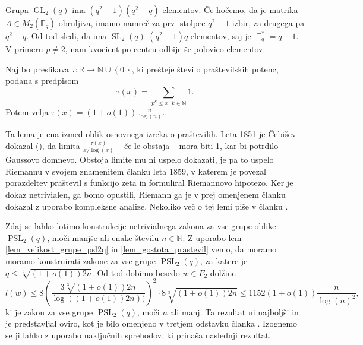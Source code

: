     \begin{dokaz}
    Grupa $\operatorname{GL}_2(q)$ ima $(q^2  -1)(q^2 - q)$ elementov. Če hočemo, da je matrika $A \in M_2(\mathbb{F}_q)$ obrnljiva, imamo namreč za prvi stolpec $q^2 -1$ izbir, za drugega pa $q^2 - q$.
    Od tod sledi, da ima $\operatorname{SL}_2(q)$ $(q^2  -1)q$ elementov, saj je $\lvert \mathbb{F}_q^{*} \rvert = q-1$. V primeru $p \neq 2$, nam kvocient po centru odbije še polovico elementov.   
    \end{dokaz}
    
    \begin{lema}
    \label{lem_gostota_prastevil}
    Naj bo preslikava $\tau : \mathbb{R} \to \mathbb{N} \cup \left\{ 0\right\}$, ki prešteje število praštevilskih potenc, podana s predpisom \begin{equation*}
    \tau(x) = \sum_{p^{k} \le x, \, k \in \mathbb{N}} 1.
    \end{equation*}  
     Potem velja $\tau(x) = (1 + o(1)) \frac{n}{\log(n)}$.     
    \end{lema}
    Ta lema je ena izmed oblik osnovnega izreka o praštevilih. Leta     1851 je Čebišev dokazal (\cite[str.~4--5]{Granville_1993}), da limita $\frac{\tau(x)}{x / \log(x)}$ -- če le obstaja -- mora biti 1, kar bi potrdilo Gaussovo domnevo. Obstoja limite mu ni uspelo dokazati, je pa to uspelo Riemannu v svojem znamenitem članku \cite{Riemann_1859} leta 1859, v katerem je povezal porazdeltev praštevil s funkcijo zeta in formuliral Riemannovo hipotezo.
    Ker je dokaz netrivialen, ga bomo opustili, Riemann ga je v prej omenjenem članku dokazal z uporabo kompleksne analize. 
    Nekoliko več o tej lemi piše v članku \cite{Kozma_Thom_2016}.            
   
    Zdaj se lahko lotimo konstrukcije netrivialnega zakona za vse grupe oblike $\operatorname{PSL}_2(q)$, moči manjše ali enake številu $n \in \mathbb{N}$. Z uporabo lem \ref{lem_velikost_grupe_psl2q} in \ref{lem_gostota_prastevil}
    vemo, da moramo moramo konstruirati zakone za vse grupe $\operatorname{PSL}_2(q)$, za katere je $q \le \sqrt[3]{(1 + o(1)) 2n}$. Od tod dobimo besedo $w \in F_2$ dolžine \begin{equation*}
    l(w) \le 8 \left( \frac{3 \sqrt[3]{(1 + o(1)) 2n}}{\log((1 + o(1)) 2n))}  \right)^2 \cdot 8 \sqrt[3]{(1 + o(1)) 2n} \le 1152 (1 + o(1)) \frac{n}{\log(n)^2},
    \end{equation*}  
    ki je zakon za vse grupe $\operatorname{PSL}_2(q)$, moči $n$ ali manj. Ta rezultat ni najboljši in je predstavljal oviro, kot je bilo omenjeno v tretjem odstavku članka \cite[str.~6]{Bradford_Thom_2017}.
    Izognemo se ji lahko z uporabo naključnih sprehodov, ki prinaša naslednji rezultat.

